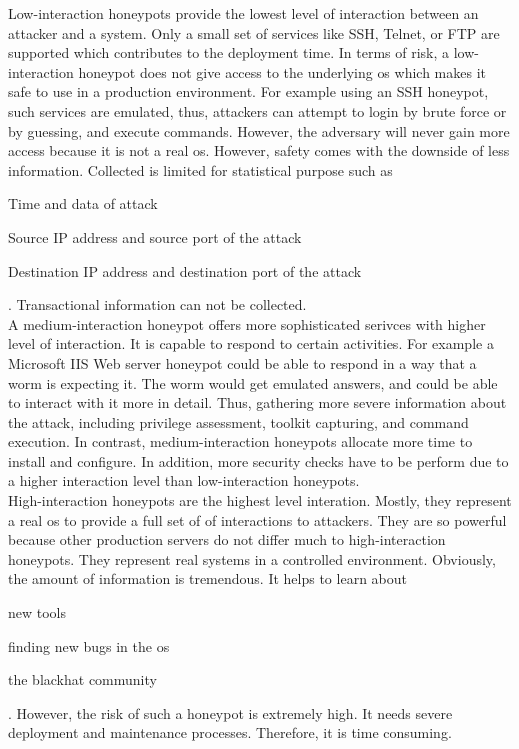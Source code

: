 Low-interaction honeypots provide the lowest level of interaction between an attacker and a system. Only a small set of services like SSH, Telnet, or FTP are supported which contributes to the deployment time. In terms of risk, a low-interaction honeypot does not give access to the underlying \ac{os} which makes it safe to use in a production environment. For example using an SSH honeypot, such services are emulated, thus, attackers can attempt to login by brute force or by guessing, and execute commands. However, the adversary will never gain more access because it is not a real \ac{os}. However, safety comes with the downside of less information. Collected is limited for statistical purpose such as
\begin{enumerate*}[label=(\roman*)]
    \item Time and data of attack
    \item Source IP address and source port of the attack
    \item Destination IP address and destination port of the attack
\end{enumerate*}.
Transactional information can not be collected. \cite{Spitzner2003}\\

A medium-interaction honeypot offers more sophisticated serivces with higher level of interaction. It is capable to respond to certain activities. For example a Microsoft IIS Web server honeypot could be able to respond in a way that a worm is expecting it. The worm would get emulated answers, and could be able to interact with it more in detail. Thus, gathering more severe information about the attack, including privilege assessment, toolkit capturing, and command execution. In contrast, medium-interaction honeypots allocate more time to install and configure. In addition, more security checks have to be perform due to a higher interaction level than low-interaction honeypots. \cite{Spitzner2003}\\

High-interaction honeypots are the highest level interation. Mostly, they represent a real \ac{os} to provide a full set of of interactions to attackers. They are so powerful because other production servers do not differ much to high-interaction honeypots. They represent real systems in a controlled environment. Obviously, the amount of information is tremendous. It helps to learn about
\begin{enumerate*}[label=(\roman*)]
    \item new tools
    \item finding new bugs in the \ac{os}
    \item the blackhat community
\end{enumerate*}. However, the risk of such a honeypot is extremely high. It needs severe deployment and maintenance processes. Therefore, it is time consuming.\\

